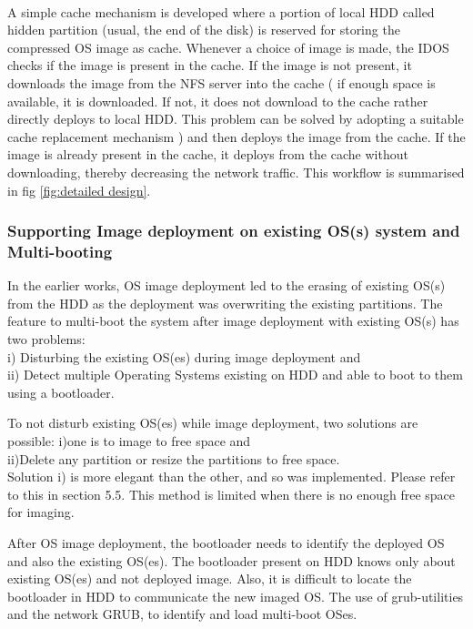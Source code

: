 \documentclass[a4paper,12pt]{article}
\begin{document}
\paragraph{}
A simple cache mechanism is developed where a portion of local HDD called hidden partition (usual, the end of the disk) is reserved for storing the compressed OS image as cache. Whenever a choice of image is made, the IDOS checks if the image is present in the cache. If the image is not present, it downloads the image from the NFS server into the cache ( if enough space is available, it is downloaded. If not, it does not download to the cache rather directly deploys to local HDD. This problem can be solved by adopting a suitable cache replacement mechanism ) and then deploys the image from the cache. If the image is already present in the cache, it deploys from the cache without downloading, thereby decreasing the network traffic. This workflow is summarised in fig \ref{fig:detailed design}.

\subsubsection{ Supporting Image deployment on existing OS(s) system and Multi-booting}
In the earlier works, OS image deployment led to the erasing of existing OS(s) from the HDD as the deployment was overwriting the existing partitions. The feature to multi-boot the system after image deployment with existing OS(s) has two problems: \\ 
i) Disturbing the existing OS(es) during image deployment and \\
ii) Detect multiple Operating Systems existing on HDD and able to boot to them using a bootloader.

To not disturb existing OS(es) while image deployment, two solutions are possible:
i)one is to image to free space and \\
ii)Delete any partition or resize the partitions to free space.\\
Solution i) is more elegant than the other, and so was implemented. Please refer to this in section 5.5. This method is limited when there is no enough free space for imaging.

After OS image deployment, the bootloader needs to identify the deployed OS and also the existing OS(es). The bootloader present on HDD knows only about existing OS(es) and not deployed image. Also, it is difficult to locate the bootloader in HDD to communicate the new imaged OS. The use of grub-utilities and the network GRUB, to identify and load multi-boot OSes.
\end{document}
